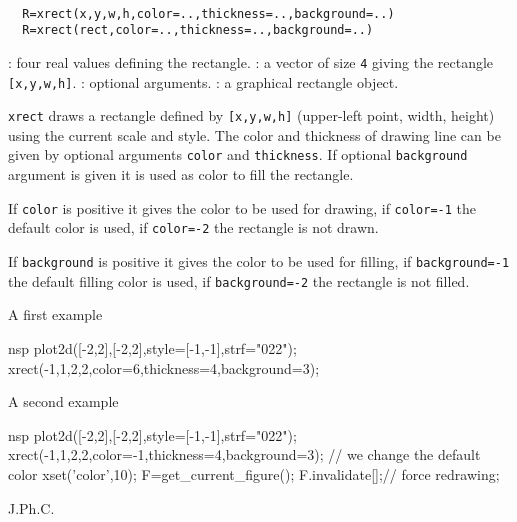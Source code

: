 
\begin{mandesc}
  \\ %
\end{mandesc}
\begin{calling_sequence}
\begin{verbatim}
  R=xrect(x,y,w,h,color=..,thickness=..,background=..)
  R=xrect(rect,color=..,thickness=..,background=..)
\end{verbatim}
\end{calling_sequence}

\begin{parameters}
  \begin{varlist}
    : four real values defining the rectangle.
    : a vector of size \verb!4! giving the rectangle
    \verb![x,y,w,h]!.
    : optional arguments.
    : a graphical rectangle object.
  \end{varlist}
\end{parameters}

\begin{mandescription}
  \verb!xrect! draws a rectangle defined by \verb![x,y,w,h]!
  (upper-left point, width, height) using the current scale and style.
  The color and thickness of drawing line can be given by optional arguments
  \verb!color! and \verb!thickness!. If optional \verb!background!
  argument is given it is used as color to fill the rectangle.

  If \verb!color! is positive it gives the color to be used for drawing,
  if \verb!color=-1! the default color is used, if  \verb!color=-2! the
  rectangle is not drawn.

  If \verb!background! is positive it gives the color to be used for filling,
  if \verb!background=-1! the default filling color is used,
  if  \verb!background=-2! the rectangle is not filled.

\end{mandescription}

\begin{examples}

A first example

  \begin{mintednsp}{nsp}
    plot2d([-2,2],[-2,2],style=[-1,-1],strf="022");
    xrect(-1,1,2,2,color=6,thickness=4,background=3);
  \end{mintednsp}

A second example

  \begin{mintednsp}{nsp}
    plot2d([-2,2],[-2,2],style=[-1,-1],strf="022");
    xrect(-1,1,2,2,color=-1,thickness=4,background=3);
    // we change the default color
    xset('color',10);
    F=get_current_figure();
    F.invalidate[];// force redrawing;
  \end{mintednsp}
\end{examples}

\begin{manseealso}
   
\end{manseealso}

\begin{authors}
  J.Ph.C.
\end{authors}
